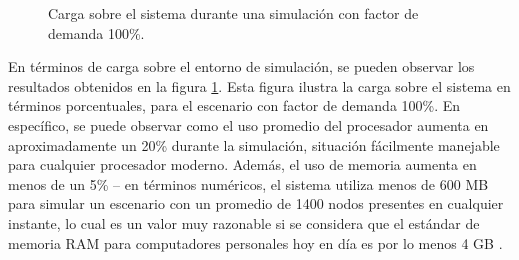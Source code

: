 \begin{figure}[tpb]
    \centering
    
    \caption{Carga sobre el sistema durante una simulación con factor de demanda 100\%.}
    \label{fig:systemload:cpuram}
\end{figure}

En términos de carga sobre el entorno de simulación, se pueden observar los resultados obtenidos en la figura \ref{fig:systemload:cpuram}. Esta figura ilustra la carga sobre el sistema en términos porcentuales, para el escenario con factor de demanda 100\%. En específico, se puede observar como el uso promedio del procesador aumenta en aproximadamente un 20\% durante la simulación, situación fácilmente manejable para cualquier procesador moderno. Además, el uso de memoria aumenta en menos de un 5\% -- en términos numéricos, el sistema utiliza menos de 600 MB para simular un escenario con un promedio de 1400 nodos presentes en cualquier instante, lo cual es un valor muy razonable si se considera que el estándar de memoria RAM para computadores personales hoy en día es por lo menos 4 GB \autocite{steamhwsurvey, unityhardwaresurvey}.

%    
